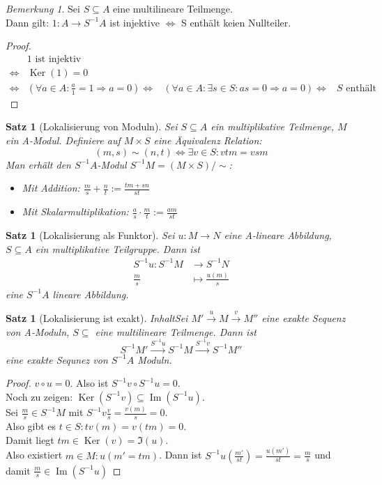 \documentclass[10pt,a4paper]{article}
\newcommand{\Ker}{\ensuremath{\operatorname{Ker}}}
\newcommand{\Img}{\ensuremath{\operatorname{Im}}}
\newcounter{thm}[section]
\theoremstyle{definition}
\theoremstyle{plain}
\newtheorem{satz}[thm]{Satz}
\theoremstyle{remark}
\newtheorem{bem}[thm]{Bemerkung}
\begin{document}
\begin{bem}
	Sei $S\subseteq A$ eine multilineare Teilmenge.\\
	Dann gilt: $1:A\rightarrow S^{-1}A$ ist injektive $\Leftrightarrow$ S enthält keien Nullteiler.
\end{bem}
\begin{proof}
	\begin{align*}
	&1\text{ ist injektiv }\\
	\Leftrightarrow&\Ker(1)=0\\
	\Leftrightarrow&(\forall a\in A:\frac{a}{1}=1\Rightarrow a=0)
	\Leftrightarrow&(\forall a\in A:\exists s\in S:as=0\Rightarrow a=0)
	\Leftrightarrow&\text{$S$ enthält eine Nullteiler}
	\end{align*}
\end{proof}
\begin{satz}[Lokalisierung von Moduln]
	Sei $S\subseteq A$ ein multiplikative Teilmenge, $M$ ein A-Modul. Definiere auf $M\times S$ eine Äquivalenz Relation:
	\[(m,s)\sim (n,t)\Leftrightarrow\exists v\in S:vtm=vsm\]
	Man erhält den $S^{-1}A$-Modul $S^{-1}M=(M\times S)/\sim$:
	\begin{itemize}
		\item Mit Addition: $\frac{m}{s}+\frac{n}{t}:=\frac{tm+sn}{st}$
		\item Mit Skalarmultiplikation: $\frac{a}{s}\cdot \frac{m}{t}:=\frac{am}{st}$
	\end{itemize}
\end{satz}
\begin{satz}[Lokalisierung als Funktor]
	Sei $u:M\rightarrow  N$ eine A-lineare Abbildung, $S\subseteq A$ ein multiplikative Teilgruppe. Dann ist
	\begin{align*}
	S^{-1}u:S^{-1}M&\rightarrow S^{-1}N\\
	\frac{m}{s}&\mapsto \frac{u(m)}{s}
	\end{align*}
	eine $S^{-1}A$ lineare Abbildung.
\end{satz}
\begin{satz}[Lokalisierung ist exakt]
	InhaltSei $M'\xrightarrow{u}M\xrightarrow{v}M''$ eine exakte Sequenz von A-Moduln, $S\subseteq$ eine multilineare Teilmenge. Dann ist
	\[S^{-1}M'\xrightarrow{S^{-1}u}S^{-1}M\xrightarrow{S^{-1}v}S^{-1}M''\]
	eine exakte Sequnez von $S^{-1}A$ Moduln.
\end{satz}
\begin{proof}
	$v\circ u=0$. Also ist $S^{-1}v\circ S^{-1}u=0$.\\
	Noch zu zeigen: $\Ker(S^{-1}v)\subseteq \Img(S^{-1}u)$.\\
	Sei $\frac{m}{s}\in S^{-1}M$ mit $S^{-1}v\frac{v}{s}=\frac{v(m)}{s}=0$.\\
	Also gibt es $t\in S:tv(m)=v(tm)=0$.\\
	Damit liegt $tm\in\Ker(v)=\Im(u)$.\\
	Also existiert $m\in M:u(m'=tm)$.
	Dann ist $S^{-1}u\left(\frac{m'}{st}\right)=\frac{u(m')}{st}=\frac{m}{s}$ und damit $\frac{m}{s}\in\Img(S^{-1}u)$
\end{proof}
\end{document}
